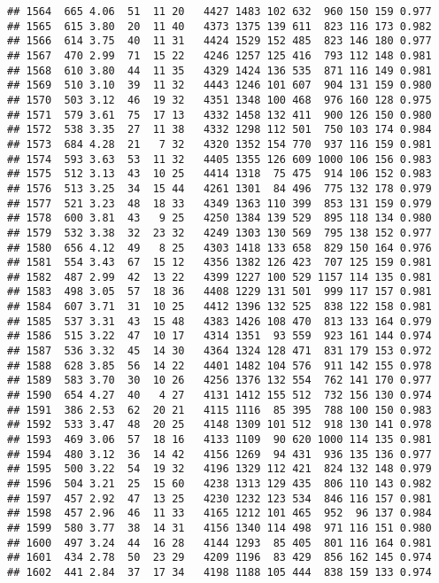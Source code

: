\documentclass[]{article}
\begin{document}
\begin{verbatim}
## 1564  665 4.06  51  11 20   4427 1483 102 632  960 150 159 0.977
## 1565  615 3.80  20  11 40   4373 1375 139 611  823 116 173 0.982
## 1566  614 3.75  40  11 31   4424 1529 152 485  823 146 180 0.977
## 1567  470 2.99  71  15 22   4246 1257 125 416  793 112 148 0.981
## 1568  610 3.80  44  11 35   4329 1424 136 535  871 116 149 0.981
## 1569  510 3.10  39  11 32   4443 1246 101 607  904 131 159 0.980
## 1570  503 3.12  46  19 32   4351 1348 100 468  976 160 128 0.975
## 1571  579 3.61  75  17 13   4332 1458 132 411  900 126 150 0.980
## 1572  538 3.35  27  11 38   4332 1298 112 501  750 103 174 0.984
## 1573  684 4.28  21   7 32   4320 1352 154 770  937 116 159 0.981
## 1574  593 3.63  53  11 32   4405 1355 126 609 1000 106 156 0.983
## 1575  512 3.13  43  10 25   4414 1318  75 475  914 106 152 0.983
## 1576  513 3.25  34  15 44   4261 1301  84 496  775 132 178 0.979
## 1577  521 3.23  48  18 33   4349 1363 110 399  853 131 159 0.979
## 1578  600 3.81  43   9 25   4250 1384 139 529  895 118 134 0.980
## 1579  532 3.38  32  23 32   4249 1303 130 569  795 138 152 0.977
## 1580  656 4.12  49   8 25   4303 1418 133 658  829 150 164 0.976
## 1581  554 3.43  67  15 12   4356 1382 126 423  707 125 159 0.981
## 1582  487 2.99  42  13 22   4399 1227 100 529 1157 114 135 0.981
## 1583  498 3.05  57  18 36   4408 1229 131 501  999 117 157 0.981
## 1584  607 3.71  31  10 25   4412 1396 132 525  838 122 158 0.981
## 1585  537 3.31  43  15 48   4383 1426 108 470  813 133 164 0.979
## 1586  515 3.22  47  10 17   4314 1351  93 559  923 161 144 0.974
## 1587  536 3.32  45  14 30   4364 1324 128 471  831 179 153 0.972
## 1588  628 3.85  56  14 22   4401 1482 104 576  911 142 155 0.978
## 1589  583 3.70  30  10 26   4256 1376 132 554  762 141 170 0.977
## 1590  654 4.27  40   4 27   4131 1412 155 512  732 156 130 0.974
## 1591  386 2.53  62  20 21   4115 1116  85 395  788 100 150 0.983
## 1592  533 3.47  48  20 25   4148 1309 101 512  918 130 141 0.978
## 1593  469 3.06  57  18 16   4133 1109  90 620 1000 114 135 0.981
## 1594  480 3.12  36  14 42   4156 1269  94 431  936 135 136 0.977
## 1595  500 3.22  54  19 32   4196 1329 112 421  824 132 148 0.979
## 1596  504 3.21  25  15 60   4238 1313 129 435  806 110 143 0.982
## 1597  457 2.92  47  13 25   4230 1232 123 534  846 116 157 0.981
## 1598  457 2.96  46  11 33   4165 1212 101 465  952  96 137 0.984
## 1599  580 3.77  38  14 31   4156 1340 114 498  971 116 151 0.980
## 1600  497 3.24  44  16 28   4144 1293  85 405  801 116 164 0.981
## 1601  434 2.78  50  23 29   4209 1196  83 429  856 162 145 0.974
## 1602  441 2.84  37  17 34   4198 1188 105 444  838 159 133 0.974

\end{verbatim}
\end{document}
